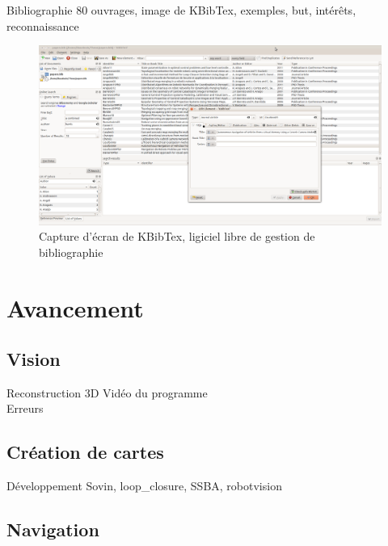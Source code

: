 \documentclass{beamer}
\begin{document}
\begin{frame}{Bibliographie}
  80 ouvrages, image de KBibTex, exemples, but, intérêts, reconnaissance
\end{frame}

\begin{frame}
\begin{figure}
\includegraphics[width=1.0\linewidth]{images/KBibTex.png}
\caption{Capture d'écran de KBibTex, ligiciel libre de gestion de bibliographie}
\end{figure}
\end{frame}


\section{Avancement}

\subsection*{Vision}
\begin{frame}{Reconstruction 3D}
  Vidéo du programme\\
  Erreurs
\end{frame}

\subsection*{Création de cartes}
\begin{frame}{Développement}
  Sovin, loop\_closure, SSBA, robotvision
\end{frame}

\subsection*{Navigation}
\begin{frame}

\end{frame}
\end{document}
